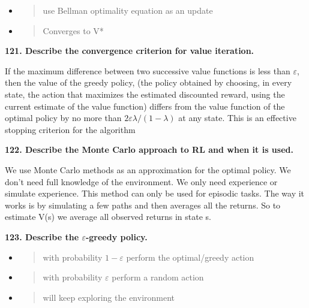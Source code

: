 \begin{itemize}
\item
  \begin{quote}
  use Bellman optimality equation as an update
  \end{quote}
\item
  \begin{quote}
  Converges to V*
  \end{quote}
\end{itemize}

\textbf{121. Describe the convergence criterion for value iteration.}

If the maximum difference between two successive value functions is less
than $\varepsilon$, then the value of the greedy policy, (the policy obtained by
choosing, in every state, the action that maximizes the estimated
discounted reward, using the current estimate of the value function)
differs from the value function of the optimal policy by no more than 
$2\varepsilon \lambda/(1-\lambda )$ at any state. This is an effective stopping 
criterion for the algorithm

\textbf{122. Describe the Monte Carlo approach to RL and when it is
used.}

We use Monte Carlo methods as an approximation for the optimal policy.
We don't need full knowledge of the environment. We only need experience
or simulate experience. This method can only be used for episodic tasks.
The way it works is by simulating a few paths and then averages all the
returns. So to estimate V(s) we average all observed returns in state s.

\textbf{123. Describe the $\varepsilon$-greedy policy.}

\begin{itemize}
\item
  \begin{quote}
  with probability $1-\varepsilon$ perform the optimal/greedy action
  \end{quote}
\end{itemize}

\begin{itemize}
\item
  \begin{quote}
  with probability $\varepsilon$ perform a random action
  \end{quote}
\end{itemize}

\begin{itemize}
\item
  \begin{quote}
  will keep exploring the environment
  \end{quote}
\end{itemize}

